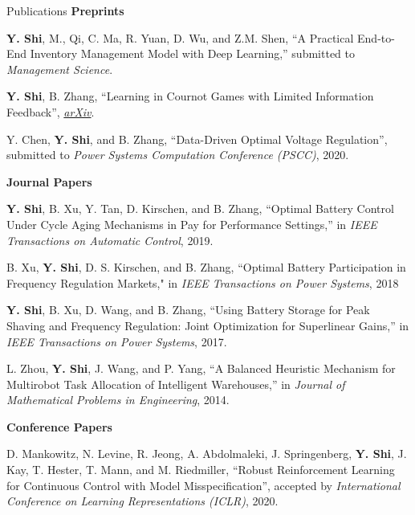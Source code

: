 \documentclass{resume} %
\begin{document}
\begin{rSection}{Publications}    
	\textbf{Preprints}
	\begin{enumerate}[wide, label={[\arabic*]. }, labelindent=0pt]
		\item \textbf{Y. Shi}, M., Qi, C. Ma, R. Yuan, D. Wu, and Z.M. Shen, ``A Practical End-to-End Inventory Management Model with Deep Learning,'' submitted to \emph{Management Science}.
		
		\item \textbf{Y. Shi}, B. Zhang, ``Learning in Cournot Games with Limited Information Feedback'', 
		\emph{\href{https://arxiv.org/abs/1906.06612}{arXiv}}.
		
		\item Y. Chen, \textbf{Y. Shi}, and B. Zhang, ``Data-Driven Optimal Voltage Regulation'', submitted to \emph{Power Systems Computation Conference (PSCC)}, 2020. 
	\end{enumerate}
	\textbf{Journal Papers}
	\begin{enumerate}[wide, label={[\arabic*]. }, labelindent=0pt]
	\setcounter{enumi}{3}
	\item \textbf{Y. Shi}, B. Xu, Y. Tan, D. Kirschen, and B. Zhang, ``Optimal Battery Control Under Cycle Aging Mechanisms in Pay for Performance Settings,'' in \emph{IEEE Transactions on Automatic Control}, 2019.
		
	\item B. Xu, \textbf{Y. Shi}, D. S. Kirschen, and B. Zhang, ``Optimal Battery Participation in Frequency Regulation Markets," in \emph{IEEE Transactions on Power Systems}, 2018
		
	\item \textbf{Y. Shi}, B. Xu, D. Wang, and B. Zhang, ``Using Battery Storage for Peak Shaving and Frequency Regulation: Joint Optimization for Superlinear Gains,'' in \emph{IEEE Transactions on Power Systems}, 2017.
		
	\item L. Zhou, \textbf{Y. Shi}, J. Wang, and P. Yang, ``A Balanced Heuristic Mechanism for Multirobot Task Allocation of Intelligent Warehouses,'' in \emph{Journal of Mathematical Problems in Engineering}, 2014.    
	\end{enumerate}
	
	\textbf{Conference Papers}
	\begin{enumerate}[wide, label={[\arabic*]. }, labelindent=0pt]
	\setcounter{enumi}{7}
	
	\item D. Mankowitz, N. Levine, R. Jeong, A. Abdolmaleki, J. Springenberg, \textbf{Y. Shi}, J. Kay, T. Hester, T. Mann, and M. Riedmiller, ``Robust Reinforcement Learning for Continuous Control with Model Misspecification'', accepted by \emph{International Conference on Learning Representations (ICLR)}, 2020.
	

\end{enumerate}
\end{rSection}
\end{document}
